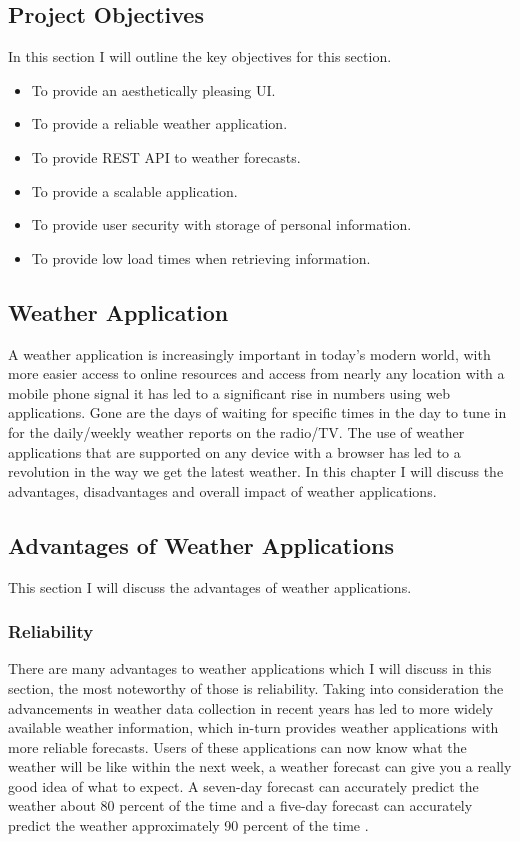 \subsection{Project Objectives}
In this section I will outline the key objectives for this section.
\begin{itemize}
    \item To provide an aesthetically pleasing UI.
    \item To provide a reliable weather application.
    \item To provide REST API to weather forecasts.
    \item To provide a scalable application.
    \item To provide user security with storage of personal information.
    \item To provide low load times when retrieving information.
\end{itemize}

\subsection{Weather Application}
A weather application is increasingly important in today's modern world, with more easier access to online resources and access from nearly any location with a mobile phone signal it has led to a significant rise in numbers using web applications. Gone are the days of waiting for specific times in the day to tune in for the daily/weekly weather reports on the radio/TV. The use of weather applications that are supported on any device with a browser has led to a revolution in the way we get the latest weather. In this chapter I will discuss the advantages, disadvantages and overall impact of weather applications.

\subsection{Advantages of Weather Applications}
This section I will discuss the advantages of weather applications.

\subsubsection{Reliability}
There are many advantages to weather applications which I will discuss in this section, the most noteworthy of those is reliability. Taking into consideration the advancements in weather data collection in recent years has led to more widely available weather information, which in-turn provides weather applications with more reliable forecasts. Users of these applications can now know what the weather will be like within the next week, a weather forecast can give you a really good idea of what to expect. A seven-day forecast can accurately predict the weather about 80 percent of the time and a five-day forecast can accurately predict the weather approximately 90 percent of the time \cite{weatherReliability}. 

